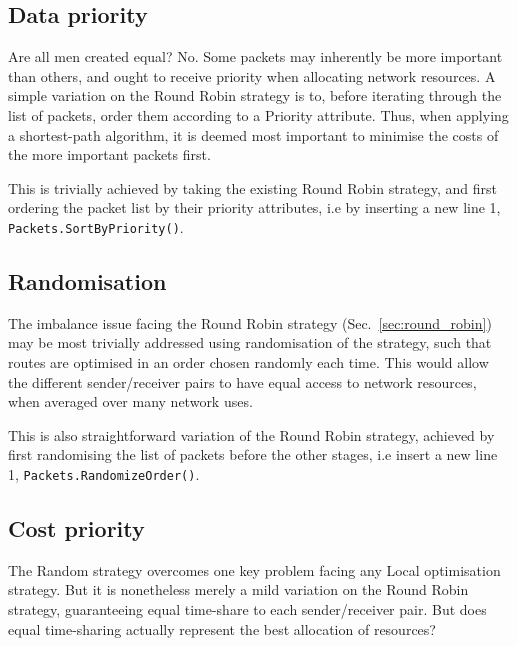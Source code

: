 \documentclass[aps,rmp,twocolumn,amsmath,amssymb,nofootinbib,superscriptaddress,longbibliography,floatfix]{revtex4-1}
\begin{document}
%
%

\subsection{Data priority} \label{sec:data_priority}

Are all men created equal? No. Some packets may inherently be more important than others, and ought to receive priority when allocating network resources. A simple variation on the {\sc Round Robin} strategy is to, before iterating through the list of packets, order them according to a {\sc Priority} attribute. Thus, when applying a shortest-path algorithm, it is deemed most important to minimise the costs of the more important packets first.

This is trivially achieved by taking the existing {\sc Round Robin} strategy, and first ordering the packet list by their priority attributes, i.e by inserting a new line 1, \mbox{\tt Packets.SortByPriority()}.

%
%

\subsection{Randomisation} \label{sec:random}

The imbalance issue facing the {\sc Round Robin} strategy (Sec.~\ref{sec:round_robin}) may be most trivially addressed using randomisation of the strategy, such that routes are optimised in an order chosen randomly each time. This would allow the different sender/receiver pairs to have equal access to network resources, when averaged over many network uses.

This is also straightforward variation of the {\sc Round Robin} strategy, achieved by first randomising the list of packets before the other stages, i.e insert a new line 1, \mbox{\tt Packets.RandomizeOrder()}.

%
%

\subsection{Cost priority} \label{sec:cost_priority}

The {\sc Random} strategy overcomes one key problem facing any {\sc Local} optimisation strategy. But it is nonetheless merely a mild variation on the {\sc Round Robin} strategy, guaranteeing equal time-share to each sender/receiver pair. But does equal time-sharing actually represent the best allocation of resources?
\end{document}
